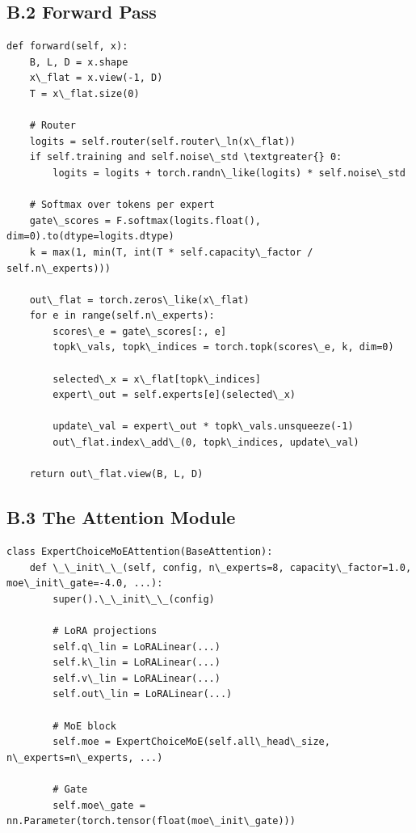 \subsection{B.2 Forward Pass}

\begin{lstlisting}
def forward(self, x):
    B, L, D = x.shape
    x\_flat = x.view(-1, D)
    T = x\_flat.size(0)
    
    # Router
    logits = self.router(self.router\_ln(x\_flat))
    if self.training and self.noise\_std \textgreater{} 0:
        logits = logits + torch.randn\_like(logits) * self.noise\_std
    
    # Softmax over tokens per expert
    gate\_scores = F.softmax(logits.float(), dim=0).to(dtype=logits.dtype)
    k = max(1, min(T, int(T * self.capacity\_factor / self.n\_experts)))
    
    out\_flat = torch.zeros\_like(x\_flat)
    for e in range(self.n\_experts):
        scores\_e = gate\_scores[:, e]
        topk\_vals, topk\_indices = torch.topk(scores\_e, k, dim=0)
        
        selected\_x = x\_flat[topk\_indices]
        expert\_out = self.experts[e](selected\_x)
        
        update\_val = expert\_out * topk\_vals.unsqueeze(-1)
        out\_flat.index\_add\_(0, topk\_indices, update\_val)
    
    return out\_flat.view(B, L, D)
\end{lstlisting}

\subsection{B.3 The Attention Module}

\begin{lstlisting}
class ExpertChoiceMoEAttention(BaseAttention):
    def \_\_init\_\_(self, config, n\_experts=8, capacity\_factor=1.0, moe\_init\_gate=-4.0, ...):
        super().\_\_init\_\_(config)
        
        # LoRA projections
        self.q\_lin = LoRALinear(...)
        self.k\_lin = LoRALinear(...)
        self.v\_lin = LoRALinear(...)
        self.out\_lin = LoRALinear(...)
        
        # MoE block
        self.moe = ExpertChoiceMoE(self.all\_head\_size, n\_experts=n\_experts, ...)
        
        # Gate
        self.moe\_gate = nn.Parameter(torch.tensor(float(moe\_init\_gate)))
\end{lstlisting}

